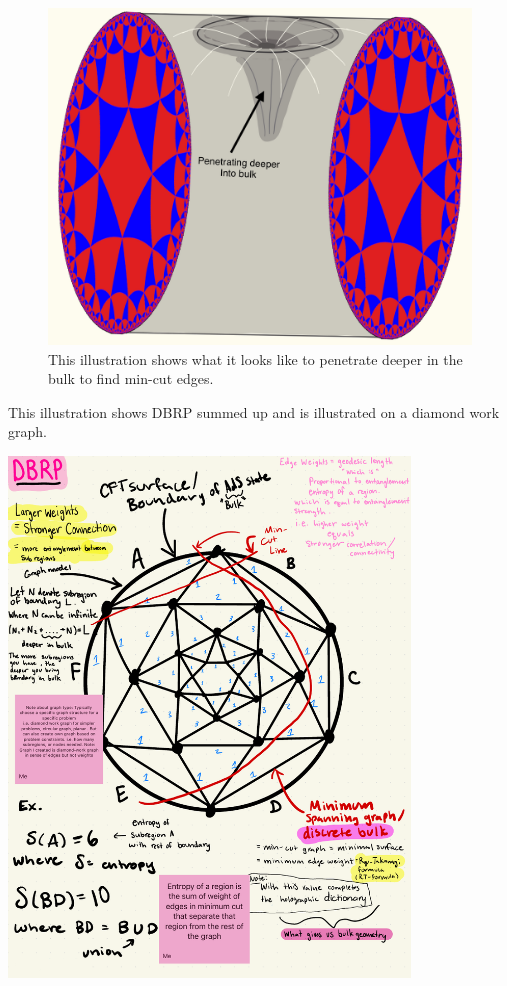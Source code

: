 \documentclass[12pt]{article}
\begin{document}
\begin{figure}[htbp]
    \centering
    \includegraphics[width=\textwidth]{deeper.jpeg}  
    \caption{This illustration shows what it looks like to penetrate deeper in the bulk to find min-cut edges.}  
    \label{fig:penetrating bulk}  
\end{figure}

\newpage

This illustration shows DBRP summed up and is illustrated on a diamond work graph. 
\begin{center}
    \includegraphics[width=0.8\textwidth]{dbrp_summed.pdf}
\end{center}
\end{document}
